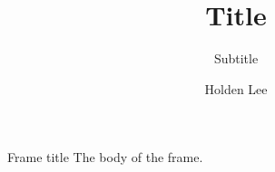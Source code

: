 \documentclass[pdf]{beamer} %
\title{Title}
\subtitle{Subtitle}
\author{Holden Lee}
\begin{document}
\begin{frame}
\titlepage
\end{frame}
\begin{frame}{Frame title}
The body of the frame.
\end{frame}
\end{document}
